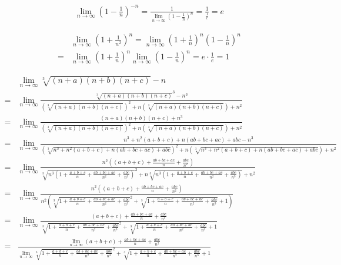 \documentclass[a4paper,german,12pt,smallheadings]{scrartcl}
\begin{document}
\begin{align*}
  \lim_{n \to \infty} \left(1- \frac{1}{n}\right)^{-n} = \frac{1}{\lim_{n \to \infty} \left(1- \frac{1}{n}\right)^{n}} = \frac{1}{\frac{1}{e}} = e
\end{align*}

\begin{align*}
  &\lim_{n \to \infty} \left(1 + \frac{1}{n^2}\right)^{n} = \lim_{n \to \infty} \left(1+\frac{1}{n}\right)^n \left(1-\frac{1}{n}\right)^n \\
  = &\lim_{n \to \infty} \left(1+\frac{1}{n}\right)^n \lim_{n \to \infty} \left(1-\frac{1}{n}\right)^n = e \cdot \frac{1}{e} = 1
\end{align*}


\begin{landscape}
\begin{align*}
  &\lim_{n \to \infty} \sqrt[3]{(n+a)(n+b)(n+c)} - n \\
  = &\lim_{n \to \infty} \frac{\sqrt[3]{(n+a)(n+b)(n+c)}^3 - n^3}{\left(\sqrt[3]{(n+a)(n+b)(n+c)}\right)^2 + n\left(\sqrt[3]{(n+a)(n+b)(n+c)}\right) + n^2} \\
  = &\lim_{n \to \infty} \frac{(n+a)(n+b)(n+c) + n^3}{\left(\sqrt[3]{(n+a)(n+b)(n+c)}\right)^2 + n\left(\sqrt[3]{(n+a)(n+b)(n+c)}\right) + n^2} \\
  = &\lim_{n \to \infty} \frac{n^3 + n^2(a+b+c) + n(ab+bc+ac) + abc - n^3}{\left(\sqrt[3]{n^3 + n^2(a+b+c) + n(ab+bc+ac) + abc }\right)^2 + n\left(\sqrt[3]{n^3 + n^2(a+b+c) + n(ab+bc+ac) + abc }\right) + n^2} \\
  = &\lim_{n \to \infty} \frac{n^2\left((a+b+c) + \frac{ab+bc+ac}{n} + \frac{abc}{n^2}\right)}{\sqrt[3]{n^3 \left(1 + \frac{a+b+c}{n} + \frac{ab+bc+ac}{n^2} + \frac{abc}{n^3}\right)}^2 + n\sqrt[3]{n^3 \left(1 + \frac{a+b+c}{n} + \frac{ab+bc+ac}{n^2} + \frac{abc}{n^3}\right)} + n^2} \\
  = &\lim_{n \to \infty} \frac{n^2\left((a+b+c) + \frac{ab+bc+ac}{n} + \frac{abc}{n^2}\right)}{n^2\left(\sqrt[3]{1 + \frac{a+b+c}{n} + \frac{ab+bc+ac}{n^2} + \frac{abc}{n^3}}^2 + \sqrt[3]{1 + \frac{a+b+c}{n} + \frac{ab+bc+ac}{n^2} + \frac{abc}{n^3}} + 1\right)} \\
  = &\lim_{n \to \infty} \frac{(a+b+c) + \frac{ab+bc+ac}{n} + \frac{abc}{n^2}}{\sqrt[3]{1 + \frac{a+b+c}{n} + \frac{ab+bc+ac}{n^2} + \frac{abc}{n^3}}^2 + \sqrt[3]{1 + \frac{a+b+c}{n} + \frac{ab+bc+ac}{n^2} + \frac{abc}{n^3}} + 1} \\
  = &\frac{\lim_{n \to \infty} (a+b+c) + \frac{ab+bc+ac}{n} + \frac{abc}{n^2}}{\lim_{n \to \infty} \sqrt[3]{1 + \frac{a+b+c}{n} + \frac{ab+bc+ac}{n^2} + \frac{abc}{n^3}}^2 + \sqrt[3]{1 + \frac{a+b+c}{n} + \frac{ab+bc+ac}{n^2} + \frac{abc}{n^3}} + 1} \\

\end{align*}
\end{landscape}
\end{document}
